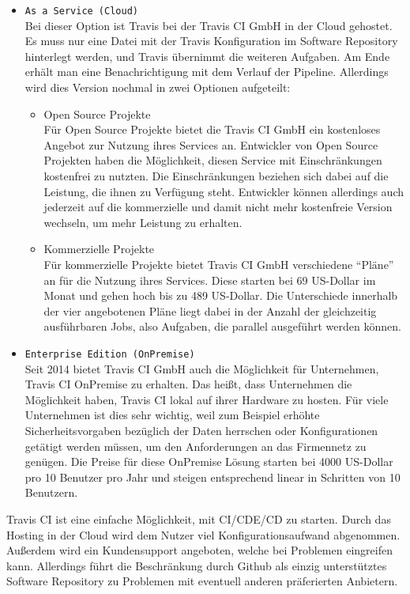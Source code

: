 \begin{itemize}
	\item \texttt{As a Service (Cloud)}\\
	Bei dieser Option ist Travis bei der Travis CI GmbH in der Cloud gehostet. Es muss nur eine Datei mit der Travis Konfiguration im Software Repository hinterlegt werden, und Travis übernimmt die weiteren Aufgaben. Am Ende erhält man eine Benachrichtigung mit dem Verlauf der Pipeline. Allerdings wird dies Version nochmal in zwei Optionen aufgeteilt:
	\begin{itemize}
		\item Open Source Projekte\\
		Für Open Source Projekte bietet die Travis CI GmbH ein kostenloses Angebot zur Nutzung ihres Services an. Entwickler von Open Source Projekten haben die Möglichkeit, diesen Service mit Einschränkungen kostenfrei zu nutzten. Die Einschränkungen beziehen sich dabei auf die Leistung, die ihnen zu Verfügung steht. Entwickler können allerdings auch jederzeit auf die kommerzielle und damit nicht mehr kostenfreie Version wechseln, um mehr Leistung zu erhalten.
		\item Kommerzielle Projekte\\
		Für kommerzielle Projekte bietet Travis CI GmbH verschiedene \enquote{Pläne} an für die Nutzung ihres Services. Diese starten bei 69 US-Dollar im Monat und gehen hoch bis zu 489 US-Dollar. Die Unterschiede innerhalb der vier angebotenen Pläne liegt dabei in der Anzahl der gleichzeitig ausführbaren Jobs, also Aufgaben, die parallel ausgeführt werden können.
	\end{itemize}
	\item \texttt{Enterprise Edition (OnPremise)}\\
	Seit 2014 bietet Travis CI GmbH auch die Möglichkeit für Unternehmen, Travis CI OnPremise zu erhalten. Das heißt, dass Unternehmen die Möglichkeit haben, Travis CI lokal auf ihrer Hardware zu hosten. Für viele Unternehmen ist dies sehr wichtig, weil zum Beispiel erhöhte Sicherheitsvorgaben bezüglich der Daten herrschen oder Konfigurationen getätigt werden müssen, um den Anforderungen an das Firmennetz zu genügen. Die Preise für diese OnPremise Lösung starten bei 4000 US-Dollar pro 10 Benutzer pro Jahr und steigen entsprechend linear in Schritten von 10 Benutzern.
\end{itemize}
Travis CI ist eine einfache Möglichkeit, mit \ac{CI}/\ac{CDE}/\ac{CD} zu starten. Durch das Hosting in der Cloud wird dem Nutzer viel Konfigurationsaufwand abgenommen. Außerdem wird ein Kundensupport angeboten, welche bei Problemen eingreifen kann. Allerdings führt die Beschränkung durch Github als einzig unterstütztes Software Repository zu Problemen mit eventuell anderen präferierten Anbietern.
